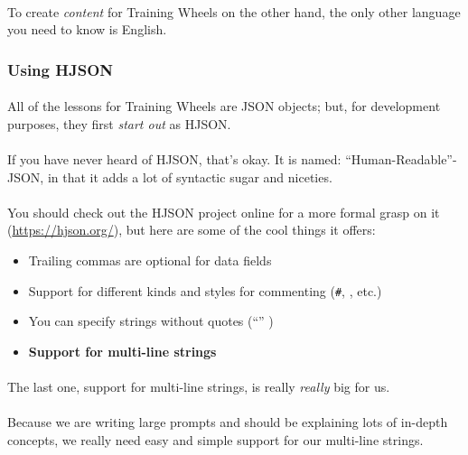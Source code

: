\documentclass[11pt]{article}
\begin{document}
	\paragraph{} To create \textit{content} for Training Wheels on the other hand, the only other language you need to know is English.

	\subsubsection{Using HJSON}

	\paragraph{} All of the lessons for Training Wheels are JSON objects; but, for development purposes, they first \textit{start out} as HJSON.

	\paragraph{} If you have never heard of HJSON, that's okay. It is named: ``Human-Readable''-JSON, in that it adds a lot of syntactic sugar and niceties. 

	\paragraph{} You should check out the HJSON project online for a more formal grasp on it (\href{https://hjson.org/}{https://hjson.org/}), but here are some of the cool things it offers:

	\begin{itemize}
		\item Trailing commas are optional for data fields
		\item Support for different kinds and styles for commenting (\texttt{\#}, \texttt{\/\/}, etc.)
		\item You can specify strings without quotes (``'' )
		\item \textbf{Support for multi-line strings}
	\end{itemize}

	\paragraph{} The last one, support for multi-line strings, is really \textit{really} big for us.

	\paragraph{} Because we are writing large prompts and should be explaining lots of in-depth concepts, we really need easy and simple support for our multi-line strings.
\end{document}
